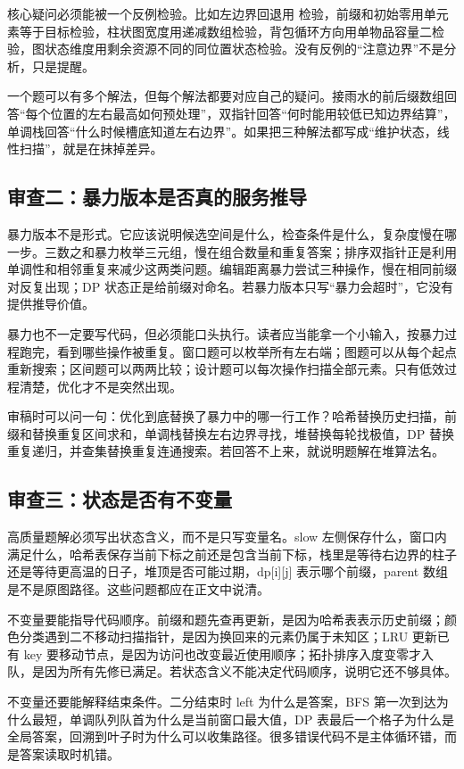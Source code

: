 核心疑问必须能被一个反例检验。比如左边界回退用  检验，前缀和初始零用单元素等于目标检验，柱状图宽度用递减数组检验，背包循环方向用单物品容量二检验，图状态维度用剩余资源不同的同位置状态检验。没有反例的“注意边界”不是分析，只是提醒。

一个题可以有多个解法，但每个解法都要对应自己的疑问。接雨水的前后缀数组回答“每个位置的左右最高如何预处理”，双指针回答“何时能用较低已知边界结算”，单调栈回答“什么时候槽底知道左右边界”。如果把三种解法都写成“维护状态，线性扫描”，就是在抹掉差异。

\subsection{审查二：暴力版本是否真的服务推导}

暴力版本不是形式。它应该说明候选空间是什么，检查条件是什么，复杂度慢在哪一步。三数之和暴力枚举三元组，慢在组合数量和重复答案；排序双指针正是利用单调性和相邻重复来减少这两类问题。编辑距离暴力尝试三种操作，慢在相同前缀对反复出现；DP 状态正是给前缀对命名。若暴力版本只写“暴力会超时”，它没有提供推导价值。

暴力也不一定要写代码，但必须能口头执行。读者应当能拿一个小输入，按暴力过程跑完，看到哪些操作被重复。窗口题可以枚举所有左右端；图题可以从每个起点重新搜索；区间题可以两两比较；设计题可以每次操作扫描全部元素。只有低效过程清楚，优化才不是突然出现。

审稿时可以问一句：优化到底替换了暴力中的哪一行工作？哈希替换历史扫描，前缀和替换重复区间求和，单调栈替换左右边界寻找，堆替换每轮找极值，DP 替换重复递归，并查集替换重复连通搜索。若回答不上来，就说明题解在堆算法名。

\subsection{审查三：状态是否有不变量}

高质量题解必须写出状态含义，而不是只写变量名。slow 左侧保存什么，窗口内满足什么，哈希表保存当前下标之前还是包含当前下标，栈里是等待右边界的柱子还是等待更高温的日子，堆顶是否可能过期，dp[i][j] 表示哪个前缀，parent 数组是不是原图路径。这些问题都应在正文中说清。

不变量要能指导代码顺序。前缀和题先查再更新，是因为哈希表表示历史前缀；颜色分类遇到二不移动扫描指针，是因为换回来的元素仍属于未知区；LRU 更新已有 key 要移动节点，是因为访问也改变最近使用顺序；拓扑排序入度变零才入队，是因为所有先修已满足。若状态含义不能决定代码顺序，说明它还不够具体。

不变量还要能解释结束条件。二分结束时 left 为什么是答案，BFS 第一次到达为什么最短，单调队列队首为什么是当前窗口最大值，DP 表最后一个格子为什么是全局答案，回溯到叶子时为什么可以收集路径。很多错误代码不是主体循环错，而是答案读取时机错。

